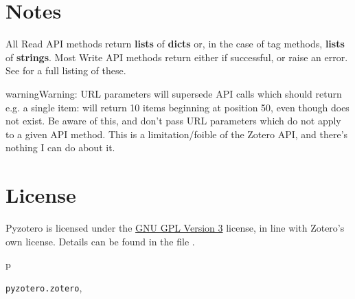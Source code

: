 \documentclass[letterpaper,10pt,english]{sphinxmanual}
\begin{document}
\chapter{Notes}
\label{index:notes}
All Read API methods return \textbf{lists} of \textbf{dicts} or, in the case of tag methods, \textbf{lists} of \textbf{strings}. Most Write API methods return either  if successful, or raise an error. See  for a full listing of these.

\begin{notice}{warning}{Warning:}
URL parameters will supersede API calls which should return e.g. a single item:  will return 10 items beginning at position 50, even though  does not exist. Be aware of this, and don't pass URL parameters which do not apply to a given API method. This is a limitation/foible of the Zotero API, and there's nothing I can do about it.
\end{notice}


\chapter{License}
\label{index:license}
Pyzotero is licensed under the \href{http://www.gnu.org/licenses/gpl.html}{GNU GPL Version 3}  license, in line with Zotero's own license. Details can be found in the file .


\renewcommand{\indexname}{Python Module Index}
\begin{theindex}
\def\bigletter#1{{\Large\sffamily#1}\nopagebreak\vspace{1mm}}
\bigletter{p}
\item {\texttt{pyzotero.zotero}}, \pageref{index:module-pyzotero.zotero}
\end{theindex}

\renewcommand{\indexname}{Index}
\printindex
\end{document}
